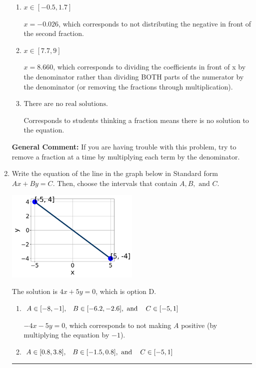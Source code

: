 \documentclass{extbook}[14pt]
\newcommand{\litem}[1]{\item #1

\rule{\textwidth}{0.4pt}}
\begin{document}
\begin{enumerate}
{\begin{enumerate}[label=\Alph*.]
 $x = -1.110$, which corresponds to dividing the second number in the numerator by the denominator rather than dividing BOTH parts of the numerator by the denominator (or removing the fractions through multiplication).
\item \( x \in [-0.5, 1.7] \)

 $x = -0.026$, which corresponds to not distributing the negative in front of the second fraction.
\item \( x \in [7.7, 9] \)

 $x = 8.660$, which corresponds to dividing the coefficients in front of x by the denominator rather than dividing BOTH parts of the numerator by the denominator (or removing the fractions through multiplication).
\item \( \text{There are no real solutions.} \)

Corresponds to students thinking a fraction means there is no solution to the equation.
\end{enumerate}

\textbf{General Comment:} If you are having trouble with this problem, try to remove a fraction at a time by multiplying each term by the denominator.
}
\litem{
Write the equation of the line in the graph below in Standard form $Ax+By=C$. Then, choose the intervals that contain $A, B, \text{ and } C$.

\begin{center}
    \includegraphics[width=0.5\textwidth]{../Figures/linearGraphToStandardB.png}
\end{center}



The solution is \( 4x + 5y = 0 \), which is option D.\begin{enumerate}[label=\Alph*.]
\item \( A \in [-8, -1], \hspace{3mm} B \in [-6.2, -2.6], \text{ and } \hspace{3mm} C \in [-5, 1] \)

 $-4x - 5y = 0$, which corresponds to not making $A$ positive (by multiplying the equation by $-1$).
\item \( A \in [0.8, 3.8], \hspace{3mm} B \in [-1.5, 0.8], \text{ and } \hspace{3mm} C \in [-5, 1] \)


\end{enumerate}}
\end{enumerate}
\end{document}
